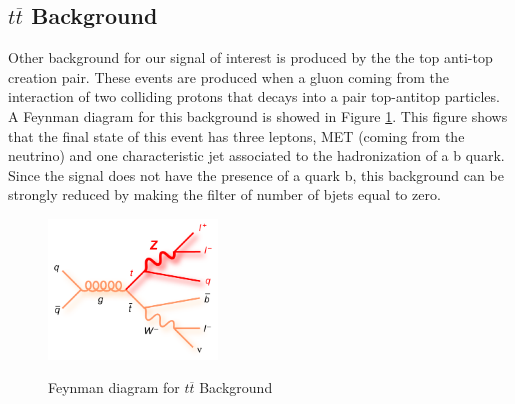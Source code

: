  \subsection{$t \overline{t}$ Background}
 
 Other background for our signal of interest is produced by the the top anti-top creation pair. These events are produced when a gluon coming from the interaction of two colliding protons that decays into
 a pair top-antitop particles. A Feynman diagram for this background is showed in Figure \ref{t_tbar_feynman}. This figure shows that the final state of this event has three leptons, MET (coming
 from the neutrino) and one characteristic jet associated to the hadronization of a b quark. Since the signal does not have the presence of a quark b, this background can be strongly reduced by 
 making the filter of number of bjets equal to zero.
 
 
  \begin{figure}[h] 
 \centering
 \caption{Feynman diagram for $t \overline{t}$ Background}
 \includegraphics[width=0.4\textwidth]{./Capitulos/Model/t_tbar}  
 \label{t_tbar_feynman}
 \end{figure} 
 
 
 
 
 